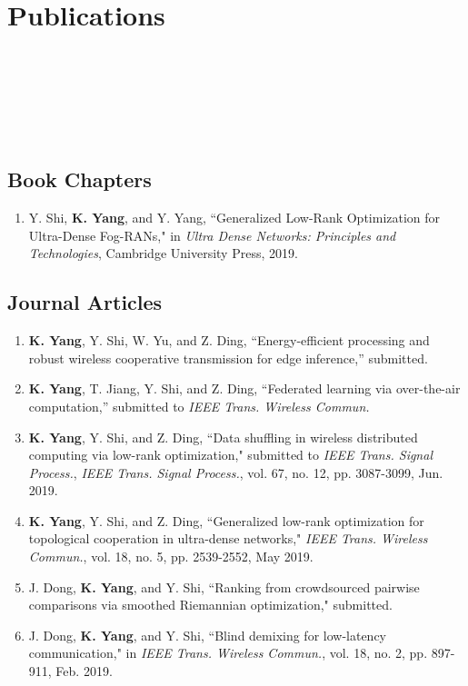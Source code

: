 \documentclass{article}
\begin{document}
\section*{\colorbox{mygrey}{Publications~~~~~~~~~~~~~~~~~~~~~~~~~~~~~~~~~~~~~~~~~~~~~~~~~~~~~~~~~~~~~~~~~~~~~~~~~~~~~~~~~~~~~~~}}

\subsection*{Book Chapters}
\begin{enumerate}
\item Y. Shi, {\bf{K. Yang}}, and Y. Yang,
``Generalized Low-Rank Optimization for Ultra-Dense Fog-RANs," in {\emph{Ultra Dense Networks: Principles and Technologies}}, Cambridge University Press, 2019.
\end{enumerate}

\subsection*{Journal Articles}

\begin{enumerate}
\item {\bf{K. Yang}}, Y. Shi, W. Yu, and Z. Ding, ``Energy-efficient processing and robust wireless cooperative transmission for edge inference,'' submitted.
\item {\bf{K. Yang}}, T. Jiang, Y. Shi, and Z. Ding, ``Federated learning via over-the-air computation,'' submitted to \emph{IEEE Trans. Wireless Commun.}
\item {\bf{K. Yang}}, Y. Shi, and Z. Ding, ``Data shuffling in wireless distributed computing via low-rank optimization,"
submitted to \emph{IEEE Trans. Signal Process.}, \emph{IEEE Trans. Signal Process.}, vol. 67, no. 12, pp. 3087-3099, Jun. 2019.
\item {\bf{K. Yang}}, Y. Shi, and Z. Ding, ``Generalized
low-rank optimization for topological cooperation in ultra-dense networks," \emph{IEEE Trans. Wireless Commun.}, vol. 18, no. 5, pp. 2539-2552, May 2019.
\item {{J. Dong}}, {\bf{K. Yang}}, and Y. Shi, ``Ranking from crowdsourced pairwise comparisons via smoothed Riemannian optimization," submitted.
\item J. Dong, {\bf{K. Yang}}, and Y. Shi, ``Blind demixing for low-latency communication," in \emph{IEEE
Trans. Wireless Commun.}, vol. 18, no. 2, pp. 897-911, Feb. 2019.
\end{enumerate}
\end{document}
